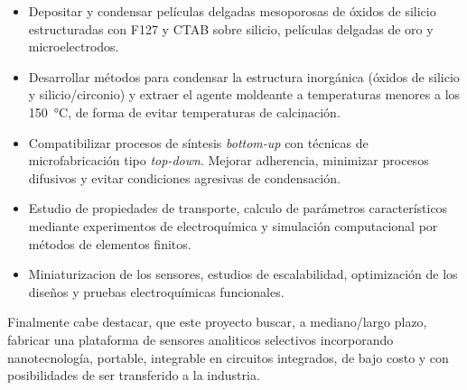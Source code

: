 	\begin{itemize}
		
		\item Depositar y condensar películas delgadas mesoporosas de óxidos de silicio estructuradas con F127 y CTAB sobre silicio, películas delgadas de oro y microelectrodos.  
		
		\item Desarrollar métodos para condensar la estructura inorgánica (óxidos de silicio y silicio/circonio) y extraer el agente moldeante a temperaturas menores a los \SI{150}{\celsius}, de forma de evitar temperaturas de calcinación. 

		\item Compatibilizar procesos de síntesis \textit{bottom-up} con técnicas de microfabricación tipo \textit{top-down}. Mejorar adherencia, minimizar procesos difusivos y evitar condiciones agresivas de condensación.

		\item Estudio de propiedades de transporte, calculo de parámetros característicos mediante experimentos de electroquímica y simulación computacional por métodos de elementos finitos.

		\item Miniaturizacion de los sensores, estudios de escalabilidad, optimización de los diseños y pruebas electroquímicas funcionales.

		\end{itemize}	

	Finalmente cabe destacar, que este proyecto buscar, a mediano/largo plazo, fabricar una plataforma de sensores analiticos selectivos incorporando nanotecnología, portable, integrable en circuitos integrados, de bajo costo y con posibilidades de ser transferido a la industria.